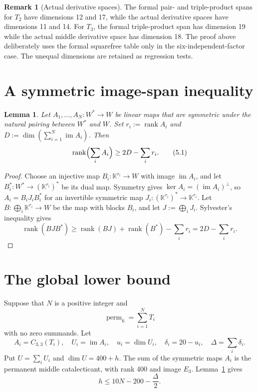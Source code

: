 \documentclass[11pt]{amsart}
\newcommand{\K}{\mathbb{K}}
\newcommand{\im}{\operatorname{im}}
\newcommand{\rank}{\operatorname{rank}}
\newcommand{\perm}{\operatorname{perm}}
\newtheorem{lemma}[theorem]{Lemma}
\theoremstyle{definition}
\newtheorem{remark}[theorem]{Remark}
\begin{document}
\begin{remark}[Actual derivative spaces]\label{rem:actual-spaces}
The formal pair- and triple-product spans for \(T_2\) have dimensions 12
and 17, while the actual derivative spaces have dimensions 11 and 14. For
\(T_3\), the formal triple-product span has dimension 19 while the actual
middle derivative space has dimension 18. The proof above deliberately uses
the formal squarefree table only in the six-independent-factor case. The
unequal dimensions are retained as regression tests.
\end{remark}

\section{A symmetric image-span inequality}

\begin{lemma}\label{lem:image-span}
Let \(A_1,\ldots,A_N:W^*\to W\) be linear maps that are symmetric under the
natural pairing between \(W^*\) and \(W\). Set \(r_i:=\rank A_i\) and
\(D:=\dim(\sum_{i=1}^N\im A_i)\). Then
\[
 \rank\Bigl(\sum_iA_i\Bigr)\ge2D-\sum_i r_i. \tag{5.1}
\]
\end{lemma}

\begin{proof}
Choose an injective map \(B_i:\K^{r_i}\to W\) with image \(\im A_i\), and
let \(B_i^*:W^*\to(\K^{r_i})^*\) be its dual map. Symmetry gives
\(\ker A_i=(\im A_i)^\perp\), so
\(A_i=B_iJ_iB_i^*\) for an invertible symmetric map
\(J_i:(\K^{r_i})^*\to\K^{r_i}\). Let
\(B:\bigoplus_i\K^{r_i}\to W\) be the map with blocks \(B_i\), and let
\(J:=\bigoplus_iJ_i\). Sylvester's inequality
gives
\[
 \rank(BJB^*)\ge\rank(BJ)+\rank(B^*)-\sum_i r_i
 =2D-\sum_i r_i.
\]
\end{proof}

\section{The global lower bound}\label{sec:global}

Suppose that \(N\) is a positive integer and
\[
 \perm_6=\sum_{i=1}^NT_i
\]
with no zero summands. Let
\[
 A_i=C_{3,3}(T_i),\quad U_i=\im A_i,\quad u_i=\dim U_i,
 \quad\delta_i=20-u_i,\quad\Delta=\sum_i\delta_i.
\]
Put \(U=\sum_iU_i\) and \(\dim U=400+h\). The sum of the symmetric maps
\(A_i\) is the permanent middle catalecticant, with rank 400 and image
\(E_3\). Lemma~\ref{lem:image-span} gives
\[
 \boxed{h\le10N-200-\frac\Delta2.} \tag{6.1}
\]
\end{document}

